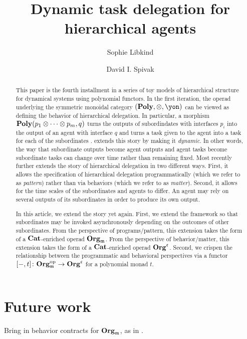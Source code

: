 \documentclass[11pt, one side, article]{memoir}
\begin{document}
\title{Dynamic task delegation for hierarchical agents}

\author{
	Sophie Libkind\and
	David I. Spivak
}


\maketitle

\begin{abstract}
This paper is the fourth installment in a series of toy models of hierarchical structure for dynamical systems using polynomial functors. In the first iteration, the operad underlying the symmetric monoidal category $(\poly, \otimes, \yon)$ can be viewed as defining the behavior of hierarchical delegation. In particular, a morphism $\mathbf{Poly}(p_1 \otimes \cdots \otimes p_m, q)$ turns the outputs of subordindates with interfaces $p_i$ into the output of an agent with interface $q$ and turns a task given to the agent into a task for each of the subordinates \cite{niu2022poly}. \cite{shapiro2022dynamic} extends this story by making it \emph{dynamic}. In other words, the way that subordinate outputs become agent outputs and agent tasks become subordinate tasks can change over time rather than remaining fixed. Most recently \cite{libkind2024pattern} further extends the story of hierarchical delegation in two different ways. First, it allows the specification of hierarchical delegation programmatically (which we refer to as \emph{pattern}) rather than via behaviors (which we refer to as \emph{matter}).  Second, it allows for the time scales of the subordinates and agents to differ. An agent may rely on several outputs of its subordinates in order to produce its own output.

In this article, we extend the story yet again. First, we extend the framework so that subordinates may be invoked asynchronously depending on the outcomes of other subordinates. From the perspective of programs/pattern, this extension takes the form of a $\mathbf{Cat}$-enriched operad $\mathbf{Org}_{\mathfrak{m}}$. From the perspective of behavior/matter, this extension takes the form of a $\mathbf{Cat}$-enriched operad $\mathbf{Org}^{\mathfrak{c}}$.  Second, we crispen the relationship between the programmatic and behavioral perspectives via a functor $[-, t] \colon \mathbf{Org}_{\mathfrak{m}}^{\textnormal{op}} \to \mathbf{Org}^{\mathfrak{c}}$ for a polynomial monad $t$.

\end{abstract}








\chapter{Future work}


Bring in behavior contracts for $\mathbf{Org}_{\mathfrak{m}}$, as in \cite{schultz2016dynamical,spivak2021learners}.

\printbibliography
\end{document}
